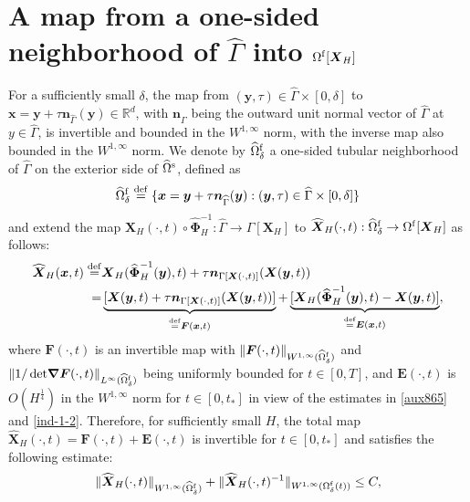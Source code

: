 \documentclass[11pt,reqno]{amsart}
\theoremstyle{definition}
\theoremstyle{plain}
\numberwithin{theorem}{section}
\numberwithin{proposition}{section}
\numberwithin{lemma}{section}
\numberwithin{equation}{section}
\newcommand{\bs}[1]{\boldsymbol{#1}}
\newcommand{\uu}[1]  {{\bs{#1}} }
\newcommand{\grad}   { \uu{\nabla}    }
\renewcommand{\(}{\bigl(}
\renewcommand{\)}{\bigr)}
\def\eqd{\stackrel{\mathrm{def}}{=}}
\begin{document}
\section{A map from a one-sided neighborhood of $\widehat\Gamma$ into \texorpdfstring{$\Omega^{\rm f}[{\bs X}_H]$}{x}}\label{appendix:map_fluid_region}

For a sufficiently small $\delta$, the map from $(\bs y,\tau)\in\widehat\Gamma\times[0,\delta]$ to $\bs x=\bs y+\tau{\bs n}_{\widehat\Gamma}(\bs y) \in \mathbb{R}^d$, with ${\bs n}_{\widehat\Gamma}$ being the outward unit normal vector of $\widehat\Gamma$ at $y\in\widehat\Gamma$, is invertible and bounded in the $W^{1,\infty}$ norm, with the inverse map also bounded in the $W^{1,\infty}$ norm. We denote by $\widehat{\Omega}^{\rm f}_\delta$ a one-sided tubular neighborhood of $\widehat\Gamma$ on the exterior side of $\widehat{\Omega}^{\rm s}$, defined as  
$$
\widehat{\Omega}^{\rm f}_\delta \eqd \{ \bs x= \bs y+\tau{\bs n}_{\widehat\Gamma}(\bs y): (\bs y,\tau)\in\widehat\Gamma\times[0,\delta] \} 
$$ 
and extend the map ${\bs X}_H(\cdot,t)\circ\widehat{\bs\Phi}_H^{-1}:\widehat\Gamma\rightarrow\Gamma[{\bs X}_H]$ to $\widehat{\bs X}_H(\cdot,t):\widehat{\Omega}^{\rm f}_\delta\rightarrow\Omega^{\rm f}[{\bs X}_H]$ 
as follows: 
\begin{align}\label{def-map-XH-appd}
\widehat{\bs X}_H(\bs x,t)
\eqd &  {\bs X}_H(\widehat{\bs\Phi}_H^{-1}(\bs y),t)  + \tau {\bs n}_{\Gamma[{\bs X}(\cdot,t)]}({\bs X}(\bs y,t)) \notag\\
=& \underbrace{[{\bs X}(\bs y,t)  + \tau {\bs n}_{\Gamma[{\bs X}(\cdot,t)]}({\bs X}(\bs y,t))]}_{\eqd {\bs F}(\bs x,t)} + \underbrace{[{\bs X}_H(\widehat{\bs\Phi}_H^{-1}(\bs y),t) - {\bs X}(\bs y,t)]}_{\eqd {\bs E}(\bs x,t)},
\end{align}
where ${\bs F}(\cdot,t) $ is an invertible map with $\|{\bs F}(\cdot,t)\|_{W^{1,\infty}(\widehat{\Omega}^{\rm f}_\delta)}$ and $\|1/\det \!\grad {\bs F}(\cdot,t) \|_{L^\infty(\widehat{\Omega}^{\rm f}_\delta)}$ being uniformly bounded for $t\in[0,T]$, 
and ${\bs E}(\cdot,t) $ is $O(H^{\frac14})$ in the $W^{1,\infty}$ norm for $t\in[0,t_*]$ in view of the estimates in \eqref{aux865} and \eqref{ind-1-2}. Therefore, for sufficiently small $H$, the total map $\widehat{\bs X}_H(\cdot,t) = {\bs F}(\cdot,t) + {\bs E}(\cdot,t)$ is invertible for $t\in[0,t_*]$ and satisfies the following estimate:
\begin{align}\label{W1inf-hat-XH}
\| \widehat{\bs X}_H(\cdot,t)\|_{W^{1,\infty}(\widehat{\Omega}^{\rm f}_\delta)} 
+ \| \widehat{\bs X}_H(\cdot,t)^{-1} \|_{W^{1,\infty}(\Omega^{\rm f}_\delta(t))} 
\le C ,
\end{align}
\end{document}
